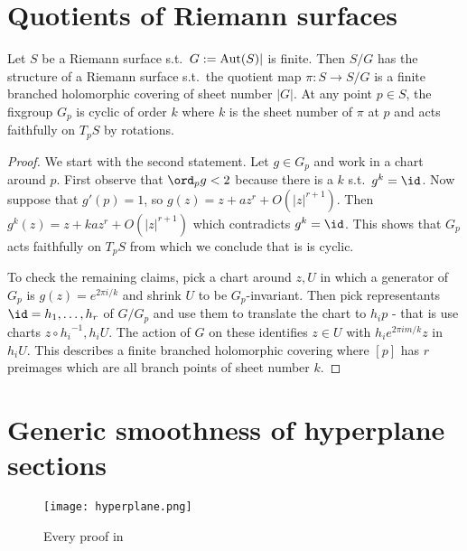 \section{Quotients of Riemann surfaces}%
\label{sec:quotients_of_riemann_surfaces}

\begin{prop}
	Let $S$ be a Riemann surface s.t.\ $G := \operatorname{Aut}(S)|$ is finite. Then $S / G$ has the structure of a Riemann surface s.t.\ the quotient map $π : S \to S/G$ is a finite branched holomorphic covering of sheet number $|G|$. At any point $p \in S$, the fixgroup $G_p$ is cyclic of order $k$ where $k$ is the sheet number of $π$ at $p$ and acts faithfully on $T_p S$ by rotations.
\end{prop}
\begin{proof}
	We start with the second statement. Let $g \in G_p$ and work in a chart around $p$. First observe that $\ord_p g < 2$ because there is a $k$ s.t.\ $g^k = \id$. Now suppose that $g'(p) = 1$, so $g(z) = z + a z^r + O(|z|^{r+1})$. Then $g^k(z) = z + k a z^r + O(|z|^{r+1})$ which contradicts $g^k = \id$. This shows that $G_p$ acts faithfully on $T_p S$ from which we conclude that is is cyclic.

	To check the remaining claims, pick a chart around $z, U$ in which a generator of $G_p$ is $g(z) = e^{2π i/k}$ and shrink $U$ to be $G_p$-invariant. Then pick representants $\id = h_1, \dots, h_r$ of $G / G_p$ and use them to translate the chart to $h_i p$ - that is use charts $z∘ {h_i}^{-1}, h_i U$. The action of $G$ on these identifies $z \in U$ with $h_i e^{2π i m/k} z$ in $h_i U$. This describes a finite branched holomorphic covering where $[p]$ has $r$ preimages which are all branch points of sheet number $k$.
\end{proof}

\section{Generic smoothness of hyperplane sections}%
\label{sec:generic_smoothness_of_hyperplane_sections}

\begin{figure}
	\center
	\texttt{[image: hyperplane.png]}
	\caption{Every proof in \cite{GH}}
\end{figure}

